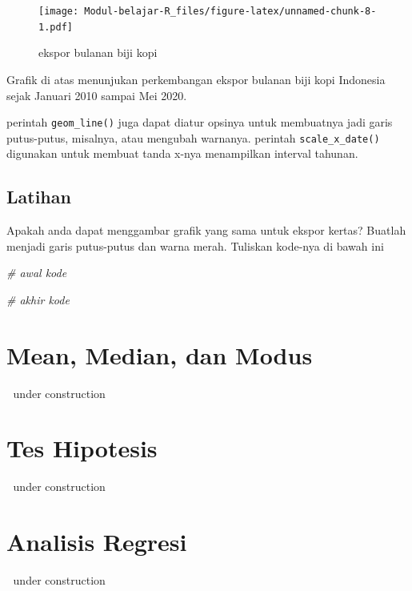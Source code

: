 \documentclass[
]{book}
\newenvironment{Shaded}{\begin{snugshade}}{\end{snugshade}}
\newcommand{\CommentTok}[1]{\textcolor[rgb]{0.56,0.35,0.01}{\textit{#1}}}
\begin{document}
\begin{figure}
\centering
\texttt{[image: Modul-belajar-R\_files/figure-latex/unnamed-chunk-8-1.pdf]}
\caption{\label{fig:unnamed-chunk-8}ekspor bulanan biji kopi}
\end{figure}

Grafik di atas menunjukan perkembangan ekspor bulanan biji kopi Indonesia sejak Januari 2010 sampai Mei 2020.

perintah \texttt{geom\_line()} juga dapat diatur opsinya untuk membuatnya jadi garis putus-putus, misalnya, atau mengubah warnanya. perintah \texttt{scale\_x\_date()} digunakan untuk membuat tanda x-nya menampilkan interval tahunan.

\hypertarget{latihan}{%
\section{Latihan}\label{latihan}}

Apakah anda dapat menggambar grafik yang sama untuk ekspor kertas? Buatlah menjadi garis putus-putus dan warna merah. Tuliskan kode-nya di bawah ini

\begin{Shaded}
\begin{Highlighting}[]
\CommentTok{# awal kode}



\CommentTok{# akhir kode}
\end{Highlighting}
\end{Shaded}

\hypertarget{mean-median-dan-modus}{%
\chapter{Mean, Median, dan Modus}\label{mean-median-dan-modus}}

🚧 under construction 🚧

\hypertarget{tes-hipotesis}{%
\chapter{Tes Hipotesis}\label{tes-hipotesis}}

🚧 under construction 🚧

\hypertarget{analisis-regresi}{%
\chapter{Analisis Regresi}\label{analisis-regresi}}

🚧 under construction 🚧

  
\end{document}
